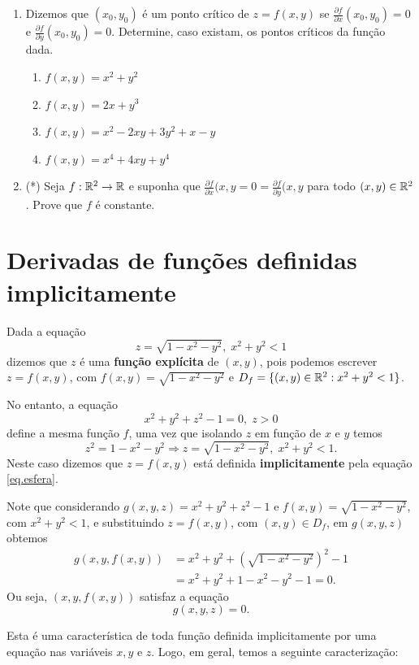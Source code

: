 \begin{enumerate}
    \item Dizemos que $(x_0,y_0)$ é um ponto crítico de $z = f(x,y)$ se $\frac{\partial f}{\partial x}(x_0,y_0) = 0$ e $\frac{\partial f}{\partial y}(x_0,y_0) = 0$. Determine, caso existam, os pontos críticos da função dada.
        \begin{enumerate}
            \item[(a)] $f(x,y) = x^2 + y^2$
            \item[(b)] $f(x,y) = 2x + y^3$
            \item[(c)] $f(x,y) = x^2 - 2xy + 3y^2 + x - y$
            \item[(d)] $f(x,y) = x^4 + 4xy + y^4$
        \end{enumerate}
    \item (*) Seja \(f: \mathbb{R}^2 \to \mathbb{R}\) e suponha que \(\frac{\partial f}{\partial x}(x,y = 0 = \frac{\partial f}{\partial y}(x,y\) para todo \((x,y)\in\mathbb{R}^2\). Prove que \(f\) é constante.
\end{enumerate}

\section{Derivadas de funções definidas implicitamente}

Dada a equação \[z = \sqrt{1 - x^2 - y^2},\; x^2 + y^2 < 1\] dizemos que \(z\) é uma \textbf{função explícita} de \((x,y)\), pois podemos escrever \(z = f(x,y)\), com \(f(x,y) = \sqrt{1 - x^2 - y^2}\) e \(D_f = \{(x,y)\in\mathbb{R}^2 : x^2 + y^2 < 1\}\).

No entanto, a equação
\begin{equation}\label{eq.esfera}
    x^2 + y^2 + z^2 - 1 = 0,\; z>0
\end{equation}
define a mesma função \(f\), uma vez que isolando \(z\) em função de \(x\) e \(y\) temos \[z^2 = 1 - x^2 - y^2 \Rightarrow z = \sqrt{1-x^2-y^2},\; x^2 + y^2 < 1.\] Neste caso dizemos que \(z = f(x,y)\) está definida \textbf{implicitamente} pela equação \eqref{eq.esfera}.

\begin{remark}
    Note que considerando \(g(x,y,z) = x^2 + y^2 + z^2 -1\) e \(f(x,y) = \sqrt{1-x^2-y^2}\), com \(x^2 + y^2 < 1\), e substituindo \(z = f(x,y)\), com \((x,y)\in D_f\), em \(g(x,y,z)\) obtemos
        \begin{align*}
            g(x,y,f(x,y)) & = x^2 + y^2 + (\sqrt{1-x^2-y^2})^2 - 1\\
            & = x^2 + y^2 + 1 - x^2 - y^2 - 1 = 0.
        \end{align*}
    Ou seja, \((x,y,f(x,y))\) satisfaz a equação \[g(x,y,z) = 0.\]

    Esta é uma característica de toda função definida implicitamente por uma equação nas variáveis \(x, y\) e \(z\). Logo, em geral, temos a seguinte caracterização:
\end{remark}

